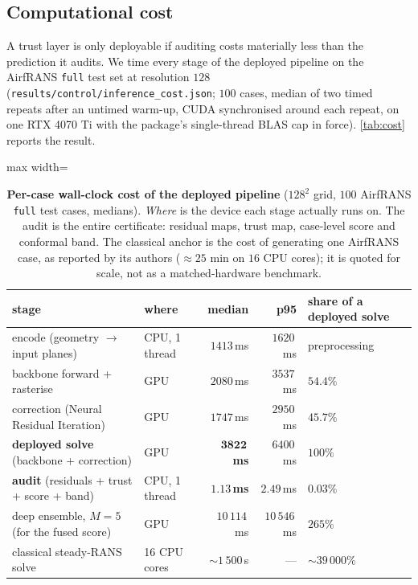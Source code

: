
\subsection{Computational cost}
\label{sec:cost}

A trust layer is only deployable if auditing costs materially less than the prediction it
audits. We time every stage of the deployed pipeline on the AirfRANS \texttt{full} test
set at resolution $128$ (\texttt{results/control/inference\_cost.json}; $100$ cases, median
of two timed repeats after an untimed warm-up, CUDA synchronised around each repeat, on
one RTX 4070 Ti with the package's single-thread BLAS cap in force).
\autoref{tab:cost} reports the result.

\begin{table}[t]
\centering
\small
\caption{\textbf{Per-case wall-clock cost of the deployed pipeline}
($128^2$ grid, $100$ AirfRANS \texttt{full} test cases, medians). \emph{Where} is the device
each stage actually runs on. The audit is the entire certificate: residual maps, trust map,
case-level score and conformal band. The classical anchor is the cost of generating one
AirfRANS case, as reported by its authors ($\approx 25$ min on $16$ CPU cores); it is
quoted for scale, not as a matched-hardware benchmark.}
\label{tab:cost}
\begin{adjustbox}{max width=\textwidth}
\begin{tabular}{l l r r l}
\toprule
stage & where & median & p95 & share of a deployed solve \\
\midrule
encode (geometry $\to$ input planes) & CPU, 1 thread & $1413$\,ms & $1620$\,ms & preprocessing \\
backbone forward + rasterise & GPU & $2080$\,ms & $3537$\,ms & $54.4\%$ \\
correction (Neural Residual Iteration) & GPU & $1747$\,ms & $2950$\,ms & $45.7\%$ \\
\midrule
\textbf{deployed solve} (backbone + correction) & GPU & $\mathbf{3822}$\,\textbf{ms} & $6400$\,ms & $100\%$ \\
\midrule
\textbf{audit} (residuals + trust + score + band) & CPU, 1 thread & $\mathbf{1.13}$\,\textbf{ms} & $2.49$\,ms & $\mathbf{0.03\%}$ \\
deep ensemble, $M{=}5$ (for the fused score) & GPU & $10\,114$\,ms & $10\,546$\,ms & $265\%$ \\
\midrule
classical steady-RANS solve \citep{bonnet2022airfrans} & 16 CPU cores & ${\sim}1\,500$\,s & --- & ${\sim}39\,000\%$ \\
\bottomrule
\end{tabular}
\end{adjustbox}
\end{table}

